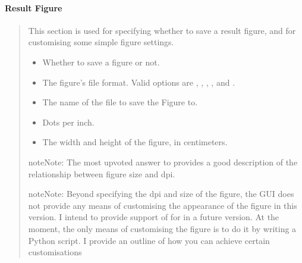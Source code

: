 \documentclass[letterpaper,10pt,english]{sphinxmanual}
\begin{document}
\paragraph{Result Figure}
\label{\detokenize{gui/usage/result:result-figure}}\begin{quote}

\sphinxAtStartPar
This section is used for specifying whether to save a result figure, and
for customising some simple figure settings.
\begin{itemize}
\item {} 
\sphinxAtStartPar
{} \sphinxhyphen{} Whether to save a figure or not.

\item {} 
\sphinxAtStartPar
{} \sphinxhyphen{} The figure’s file format. Valid options are , ,
, ,  and .

\item {} 
\sphinxAtStartPar
{} \sphinxhyphen{} The name of the file to save the Figure to.

\item {} 
\sphinxAtStartPar
{} \sphinxhyphen{} Dots per inch.

\item {} 
\sphinxAtStartPar
{} \sphinxhyphen{} The width and height of the figure, in centimeters.

\end{itemize}

\begin{sphinxadmonition}{note}{Note:}
\sphinxAtStartPar
The most up\sphinxhyphen{}voted answer to
 provides a good
description of the relationship between figure size and dpi.
\end{sphinxadmonition}

\begin{sphinxadmonition}{note}{Note:}
\sphinxAtStartPar
Beyond specifying the dpi and size of the figure, the GUI does not provide
any means of customising the appearance of the figure in this version.
I intend to provide support of for in a future version.  At the moment,
the only means of customising the figure is to do it by writing a Python
script. I provide an outline of how you can achieve certain customisations
{\hyperref[\detokenize{misc/figure_customisation::doc}]{}}
\end{sphinxadmonition}
\end{quote}
\end{document}
